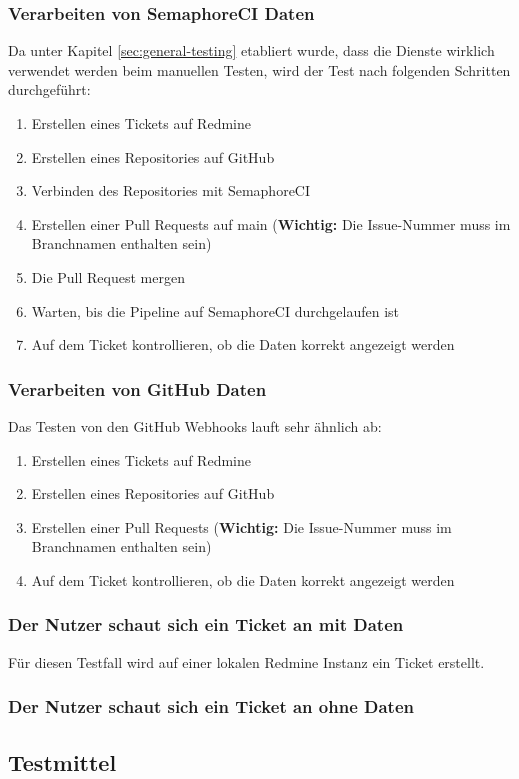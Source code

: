 \begin{minipage}{\textwidth}
  \subsubsection{Verarbeiten von SemaphoreCI Daten}
  Da unter Kapitel \ref{sec:general-testing} etabliert wurde, dass die Dienste wirklich verwendet werden beim manuellen Testen,
  wird der Test nach folgenden Schritten durchgeführt:
  \begin{enumerate}
    \item Erstellen eines Tickets auf Redmine
    \item Erstellen eines Repositories auf GitHub
    \item Verbinden des Repositories mit SemaphoreCI
    \item Erstellen einer Pull Requests auf main (\textbf{Wichtig:} Die Issue-Nummer muss im Branchnamen enthalten sein)
    \item Die Pull Request mergen
    \item Warten, bis die Pipeline auf SemaphoreCI durchgelaufen ist
    \item Auf dem Ticket kontrollieren, ob die Daten korrekt angezeigt werden
  \end{enumerate}
\end{minipage}

\begin{minipage}{\textwidth}
  \subsubsection{Verarbeiten von GitHub Daten}
  Das Testen von den GitHub Webhooks lauft sehr ähnlich ab:
  \begin{enumerate}
    \item Erstellen eines Tickets auf Redmine
    \item Erstellen eines Repositories auf GitHub
    \item Erstellen einer Pull Requests (\textbf{Wichtig:} Die Issue-Nummer muss im Branchnamen enthalten sein)
    \item Auf dem Ticket kontrollieren, ob die Daten korrekt angezeigt werden
  \end{enumerate}
\end{minipage}

\subsubsection{Der Nutzer schaut sich ein Ticket an mit Daten}
Für diesen Testfall wird auf einer lokalen Redmine Instanz ein Ticket erstellt. 
\subsubsection{Der Nutzer schaut sich ein Ticket an ohne Daten}

\subsection{Testmittel}
